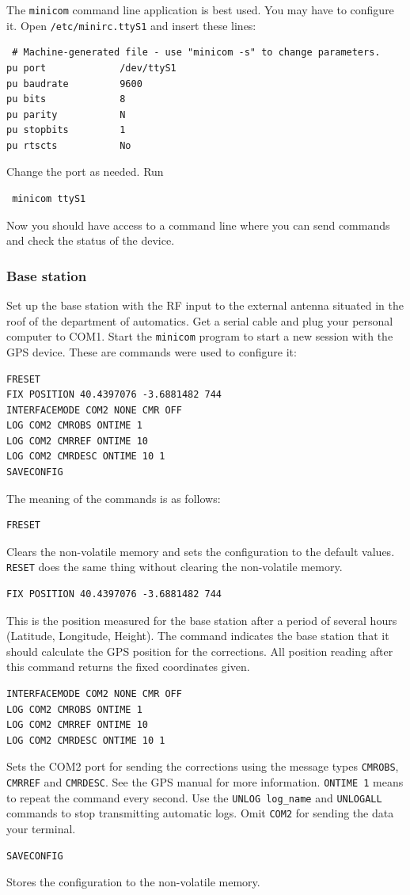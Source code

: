 The \texttt{minicom} command line application is best used. You may have to configure it. Open \texttt{/etc/minirc.ttyS1} and insert these lines:
\begin{verbatim}
 # Machine-generated file - use "minicom -s" to change parameters.
pu port             /dev/ttyS1
pu baudrate         9600
pu bits             8
pu parity           N
pu stopbits         1
pu rtscts           No 
\end{verbatim} 
Change the port as needed.
Run
\begin{verbatim}
 minicom ttyS1
\end{verbatim}
Now you should have access to a command line where you can send commands and check the status of the device.

\subsubsection{Base station}
Set up the base station with the RF input to the external antenna situated in the roof of the department of automatics. Get a serial cable and plug your personal computer to COM1. Start the \texttt{minicom} program to start a new session with the GPS device. These are commands were used to configure it:
\begin{verbatim}
FRESET
FIX POSITION 40.4397076 -3.6881482 744
INTERFACEMODE COM2 NONE CMR OFF
LOG COM2 CMROBS ONTIME 1
LOG COM2 CMRREF ONTIME 10
LOG COM2 CMRDESC ONTIME 10 1
SAVECONFIG
\end{verbatim} 
The meaning of the commands is as follows:
\begin{verbatim}
FRESET
\end{verbatim} 
Clears the non-volatile memory and sets the configuration to the default values. \texttt{RESET} does the same thing without clearing the non-volatile memory.
\begin{verbatim}
FIX POSITION 40.4397076 -3.6881482 744
\end{verbatim} 
This is the position measured for the base station after a period of several hours (Latitude, Longitude, Height). The command indicates the base station that it should calculate the GPS position for the corrections. All position reading after this command returns the fixed coordinates given.
\begin{verbatim}
INTERFACEMODE COM2 NONE CMR OFF
LOG COM2 CMROBS ONTIME 1
LOG COM2 CMRREF ONTIME 10
LOG COM2 CMRDESC ONTIME 10 1
\end{verbatim} 
Sets the COM2 port for sending the corrections using the message types \texttt{CMROBS}, \texttt{CMRREF} and \texttt{CMRDESC}. See the GPS manual for more information. \texttt{ONTIME 1} means to repeat the command every second. Use the \texttt{UNLOG log\_name} and \texttt{UNLOGALL} commands to stop transmitting automatic logs.  Omit \texttt{COM2} for sending the data your terminal.
\begin{verbatim}
SAVECONFIG
\end{verbatim} 
Stores the configuration to the non-volatile memory.

